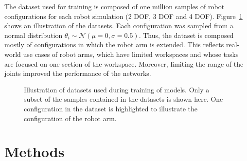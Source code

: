 \documentclass[conference]{IEEEtran}
\begin{document}
The dataset used for training is composed of one million samples of robot configurations for each robot simulation (2 DOF, 3 DOF and 4 DOF). Figure~\ref{fig:datasets} shows an illustration of the datasets. Each configuration was sampled from a normal distribution $ \theta_i \sim \mathcal{N}(\mu=0, \sigma=0.5) $. Thus, the dataset is composed mostly of configurations in which the robot arm is extended. This reflects real-world use cases of robot arms, which have limited workspaces and whose tasks are focused on one section of the workspace. Moreover, limiting the range of the joints improved the performance of the networks.

\begin{figure}[t]
    \centering
    \caption{Illustration of datasets used during training of models. Only a subset of the samples contained in the datasets is shown here. One configuration in the dataset is highlighted to illustrate the configuration of the robot arm.}
    \label{fig:datasets}
\end{figure}

\section*{Methods}
\end{document}
